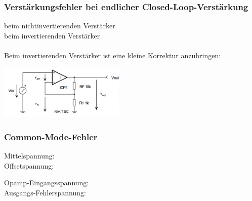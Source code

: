 		\subsubsection{Verstärkungsfehler bei endlicher Closed-Loop-Verstärkung
		}
			\begin{minipage}{12cm}
               	beim nichtinvertierenden Verstärker 
               	\\
               	beim invertierenden Verstärker
               	\hspace{8mm}\\ \\
               	Beim invertierenden Verstärker ist eine kleine Korrektur
               	anzubringen: 
               	\hspace*{10mm}\\
	        \end{minipage}
			\begin{minipage}{6cm}
               	\includegraphics[width=6cm]{./bilder/verstaerkungsfaktor.png}
            \end{minipage}

		\subsubsection{Common-Mode-Fehler }
			\begin{minipage}{6cm}
            	Mittelspannung: \\
            	Offsetspannung: 
            \end{minipage}
			\begin{minipage}{12cm}
            	Opamp-Eingangsspannung: \\
            	Ausgangs-Fehlerspannung: \hspace{0.2mm}
            \end{minipage}

